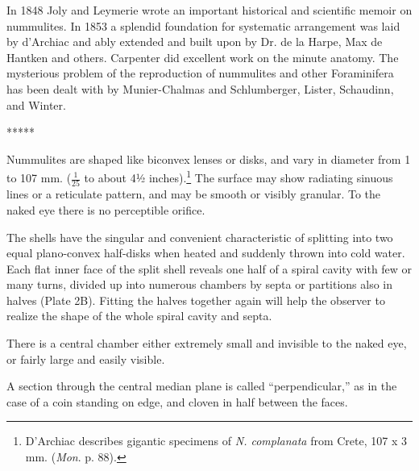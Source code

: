 \documentclass[a4paper, 12pt, oneside]{article}
\begin{document}
In 1848 Joly and Leymerie wrote an important historical and scientific memoir on nummulites. In 1853 a splendid foundation for systematic arrangement was laid by d'Archiac and ably extended and built upon by Dr. de la Harpe, Max de Hantken and others. Carpenter did excellent work on the minute anatomy. The mysterious problem of the reproduction of nummulites and other Foraminifera has been dealt with by Munier-Chalmas and Schlumberger, Lister, Schaudinn, and Winter.

\centerline{*\hspace{15mm}*\hspace{15mm}*\hspace{15mm}*\hspace{15mm}*}
\bigskip

Nummulites are shaped like biconvex lenses or disks, and vary in diameter from 1 to 107 mm. ($\frac{1}{25}$ to about 4½ inches).\footnote{D'Archiac describes gigantic specimens of \emph{N. complanata} from Crete, 107 x 3 mm. (\emph{Mon}. p. 88).} The surface may show radiating sinuous lines or a reticulate pattern, and may be smooth or visibly granular. To the naked eye there is no perceptible orifice.

The shells have the singular and convenient characteristic of splitting into two equal plano-convex half-disks when heated and suddenly thrown into cold water. Each flat inner face of the split shell reveals one half of a spiral cavity with few or many turns, divided up into numerous chambers by septa or partitions also in halves (Plate 2B). Fitting the halves together again will help the observer to realize the shape of the whole spiral cavity and septa.

There is a central chamber either extremely small and invisible to the naked eye, or fairly large and easily visible.

A section through the central median plane is called ``perpendicular,'' as in the case of a coin standing on edge, and cloven in half between the faces.
\end{document}
